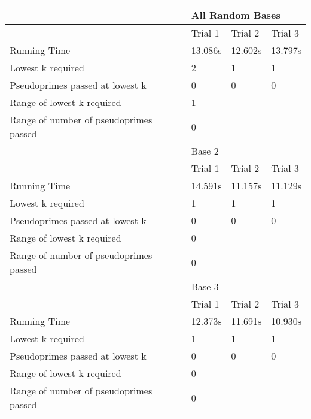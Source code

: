 \documentclass{article}
\begin{document}
\FloatBarrier
\begin{table}[h]
\begin{tabular}{@{}llll@{}}
\toprule
                                       & \multicolumn{3}{l}{All Random Bases}  \\ \midrule
                                       & Trial 1     & Trial 2    & Trial 3    \\
Running Time                           & 13.086s     & 12.602s    & 13.797s    \\
Lowest k required                      & 2           & 1          & 1          \\
Pseudoprimes passed at lowest k        & 0           & 0          & 0          \\
Range of lowest k required             & \multicolumn{3}{l}{1}                 \\
Range of number of pseudoprimes passed & \multicolumn{3}{l}{0}                 \\
                                       & \multicolumn{3}{l}{Base 2}            \\
                                       & Trial 1     & Trial 2    & Trial 3    \\
Running Time                           & 14.591s     & 11.157s    & 11.129s    \\
Lowest k required                      & 1           & 1          & 1          \\
Pseudoprimes passed at lowest k        & 0           & 0          & 0          \\
Range of lowest k required             & \multicolumn{3}{l}{0}                 \\
Range of number of pseudoprimes passed & \multicolumn{3}{l}{0}                 \\
                                       & \multicolumn{3}{l}{Base 3}            \\
                                       & Trial 1     & Trial 2    & Trial 3    \\
Running Time                           & 12.373s     & 11.691s    & 10.930s    \\
Lowest k required                      & 1           & 1          & 1          \\
Pseudoprimes passed at lowest k        & 0           & 0          & 0          \\
Range of lowest k required             & \multicolumn{3}{l}{0}                 \\
Range of number of pseudoprimes passed & \multicolumn{3}{l}{0}                 \\

\end{tabular}
\end{table}
\end{document}

